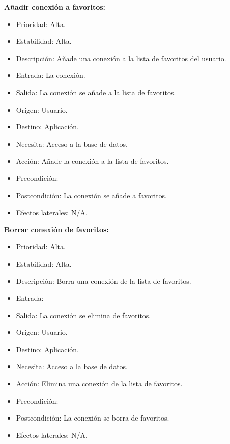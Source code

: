 \textbf{Añadir conexión a favoritos:}
\begin{itemize}
\item Prioridad: Alta.
\item Estabilidad: Alta.
\item Descripción: Añade una conexión a la lista de favoritos del usuario.
\item Entrada: La conexión.
\item Salida: La conexión se añade a la lista de favoritos.
\item Origen: Usuario.
\item Destino: Aplicación.
\item Necesita: Acceso a la base de datos.
\item Acción: Añade la conexión a la lista de favoritos.
\item Precondición:
\item Postcondición: La conexión se añade a favoritos.
\item Efectos laterales: N/A.\\

\end{itemize}

\textbf{Borrar conexión de favoritos:}
\begin{itemize}
\item Prioridad: Alta.
\item Estabilidad: Alta.
\item Descripción: Borra una conexión de la lista de favoritos.
\item Entrada:
\item Salida: La conexión se elimina de favoritos.
\item Origen: Usuario.
\item Destino: Aplicación.
\item Necesita: Acceso a la base de datos.
\item Acción: Elimina una conexión de la lista de favoritos.
\item Precondición:
\item Postcondición: La conexión se borra de favoritos.
\item Efectos laterales: N/A.\\

\end{itemize}

